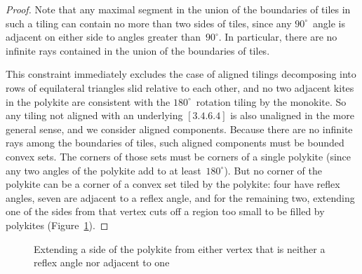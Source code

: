 \begin{proof}
Note that any maximal segment in the union of the boundaries of tiles in such
a tiling can contain no more than two sides of tiles, since any
$90^\circ$~angle is adjacent on either side to angles greater
than~$90^\circ$.  In particular, there are no infinite rays contained
in the union of the boundaries of tiles.

This constraint immediately excludes the case of aligned tilings decomposing 
into rows of equilateral triangles slid relative to each other, and no two
adjacent kites in the polykite are consistent with the
$180^\circ$~rotation tiling by the monokite.  So any tiling not
aligned with an underlying $[3.4.6.4]$ is also unaligned in the more
general sense, and we consider aligned components.  Because there are
no infinite rays among the boundaries of tiles, such aligned
components must be bounded convex sets.  The corners of those sets
must be corners of a single polykite (since any two angles of the
polykite add to at least~$180^\circ$).  But no corner of the polykite
can be a corner of a convex set tiled by the polykite: four have
reflex angles, seven are adjacent to a reflex angle, and for the
remaining two, extending one of the sides from that vertex cuts off a
region too small to be filled by polykites
(Figure~\ref{fig:polykiteconvex}).
\end{proof}

\begin{figure}[htp!]
\begin{center}
\end{center}
\caption{Extending a side of the polykite from either vertex that is
  neither a reflex angle nor adjacent to one}
\label{fig:polykiteconvex}
\end{figure}
